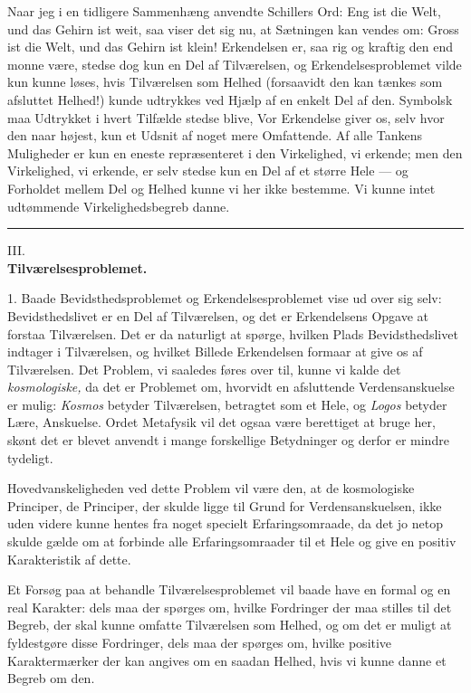 \documentclass[12pt,a4paper,openany]{book}
\newcommand{\opage}[1]{\marginnote{\footnotesize\textit{[#1]}}}
\begin{document}
Naar jeg i en tidligere Sammenhæng anvendte Schillers Ord: Eng ist die Welt,
und das Gehirn ist weit, saa viser det sig nu, at Sætningen kan vendes om:
Gross ist die Welt, und das Gehirn ist klein! Erkendelsen er, saa rig og
kraftig den end monne være, stedse dog kun en Del af Tilværelsen, og
Erkendelsesproblemet vilde kun kunne løses, hvis Tilværelsen
\opage{52}som Helhed (forsaavidt den kan tænkes som afsluttet Helhed!) kunde
udtrykkes ved Hjælp af en enkelt Del af den. Symbolsk maa Udtrykket i hvert
Tilfælde stedse blive, Vor Erkendelse giver os, selv hvor den naar højest, kun
et Udsnit af noget mere Omfattende. Af alle Tankens Muligheder er kun en eneste
repræsenteret i den Virkelighed, vi erkende; men den Virkelighed, vi erkende,
er selv stedse kun en Del af et større Hele --- og Forholdet mellem Del og
Helhed kunne vi her ikke bestemme. Vi kunne intet udtømmende Virkelighedsbegreb
danne.

\begin{center}\rule{2cm}{0.4pt}\end{center}

\opage{53}

\begin{center}III.\\[6pt]
\textbf{\Large Tilværelsesproblemet.}\end{center}

1. Baade Bevidsthedsproblemet og Erkendelsesproblemet vise ud over sig selv:
Bevidsthedslivet er en Del af Tilværelsen, og det er Erkendelsens Opgave at
forstaa Tilværelsen. Det er da naturligt at spørge, hvilken Plads
Bevidsthedslivet indtager i Tilværelsen, og hvilket Billede Erkendelsen formaar
at give os af Tilværelsen. Det Problem, vi saaledes føres over til, kunne vi
kalde det \textit{kosmologiske,} da det er Problemet om, hvorvidt en
afsluttende Verdensanskuelse er mulig: \textit{Kosmos} betyder Tilværelsen,
betragtet som et Hele, og \textit{Logos} betyder Lære, Anskuelse. Ordet
Metafysik vil det ogsaa være berettiget at bruge her, skønt det er blevet
anvendt i mange forskellige Betydninger og derfor er mindre tydeligt.

Hovedvanskeligheden ved dette Problem vil være den, at de kosmologiske
Principer, de Principer, der skulde ligge til Grund for Verdensanskuelsen, ikke
uden videre kunne hentes fra noget specielt Erfaringsomraade, da det jo netop
skulde gælde om at forbinde alle Erfaringsomraader til et Hele og give en
positiv Karakteristik af dette.

Et Forsøg paa at behandle Tilværelsesproblemet vil baade have en formal og en
real Karakter: dels maa der spørges om, hvilke Fordringer der maa stilles til
det Begreb, der skal kunne omfatte Tilværelsen som Helhed, og om det er muligt
at fyldestgøre disse Fordringer, dels maa der spørges om, hvilke positive
Karaktermærker der kan angives om en saadan Helhed, hvis vi kunne danne et
Begreb om den.
\end{document}
